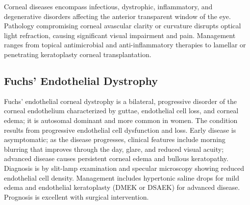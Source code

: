 


Corneal diseases encompass infectious, dystrophic, inflammatory, and degenerative disorders affecting the anterior transparent window of the eye. Pathology compromising corneal avascular clarity or curvature disrupts optical light refraction, causing significant visual impairment and pain. Management ranges from topical antimicrobial and anti-inflammatory therapies to lamellar or penetrating keratoplasty corneal transplantation.





\label{sec:Corneal Diseases}

\subsection{Fuchs' Endothelial Dystrophy}
\label{sec:Fuchs' Endothelial Dystrophy}
Fuchs' endothelial corneal dystrophy is a bilateral, progressive disorder of the corneal endothelium characterized by guttae, endothelial cell loss, and corneal edema; it is autosomal dominant and more common in women. The condition results from progressive endothelial cell dysfunction and loss. Early disease is asymptomatic; as the disease progresses, clinical features include morning blurring that improves through the day, glare, and reduced visual acuity; advanced disease causes persistent corneal edema and bullous keratopathy. Diagnosis is by slit-lamp examination and specular microscopy showing reduced endothelial cell density. Management includes hypertonic saline drops for mild edema and endothelial keratoplasty (DMEK or DSAEK) for advanced disease. Prognosis is excellent with surgical intervention.

